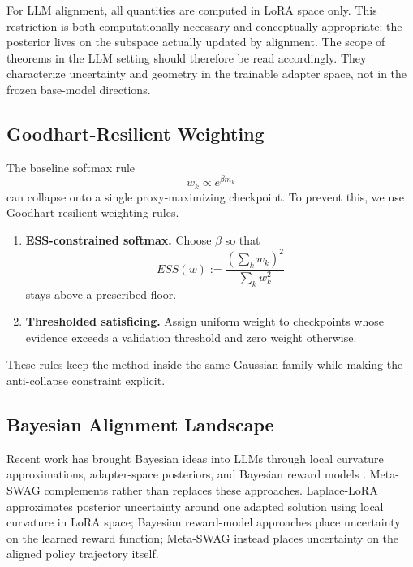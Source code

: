 \documentclass[10pt]{article}
\theoremstyle{plain}
\theoremstyle{definition}
\theoremstyle{remark}
\begin{document}
For LLM alignment, all quantities are computed in LoRA space only. This restriction is both computationally necessary and conceptually appropriate: the posterior lives on the subspace actually updated by alignment. The scope of theorems in the LLM setting should therefore be read accordingly. They characterize uncertainty and geometry in the trainable adapter space, not in the frozen base-model directions.

\subsection{Goodhart-Resilient Weighting}

The baseline softmax rule
\begin{equation}
w_k \propto e^{\beta m_k}
\end{equation}
can collapse onto a single proxy-maximizing checkpoint. To prevent this, we use Goodhart-resilient weighting rules.
\begin{enumerate}[leftmargin=1.5em, itemsep=0.25em]
  \item \textbf{ESS-constrained softmax.} Choose $\beta$ so that
  \begin{equation}
  ESS(w) := \frac{(\sum_k w_k)^2}{\sum_k w_k^2}
  \end{equation}
  stays above a prescribed floor.
  \item \textbf{Thresholded satisficing.} Assign uniform weight to checkpoints whose evidence exceeds a validation threshold and zero weight otherwise.
\end{enumerate}
These rules keep the method inside the same Gaussian family while making the anti-collapse constraint explicit.

\subsection{Bayesian Alignment Landscape}

Recent work has brought Bayesian ideas into LLMs through local curvature approximations, adapter-space posteriors, and Bayesian reward models \citep{yang2024laplacelora,yang2024brm}. Meta-SWAG complements rather than replaces these approaches. Laplace-LoRA approximates posterior uncertainty around one adapted solution using local curvature in LoRA space; Bayesian reward-model approaches place uncertainty on the learned reward function; Meta-SWAG instead places uncertainty on the aligned policy trajectory itself.
\end{document}
